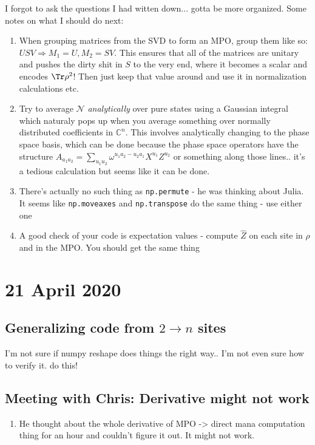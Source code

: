 \documentclass{report}
\begin{document}
I forgot to ask the questions I had witten down... gotta be more organized. Some notes on what I should do next:
\begin{enumerate}
\item When grouping matrices from the SVD to form an MPO, group them like so: $USV\Rightarrow M_1 = U, M_2= SV$. This ensures that all of the matrices are unitary and pushes the dirty shit in $S$ to the very end, where it becomes a scalar and encodes $\Tr \rho^2$! Then just keep that value around and use it in normalization calculations etc.
\item Try to average $\mathcal N$ \textit{analytically} over pure states using a Gaussian integral which naturaly pops up when you average something over normally distributed coefficients in $\mathbb C^n$. This involves analytically changing to the phase space basis, which can be done because the phase space operators have the structure $A_{a_1a_2}=\sum_{u_1u_2}\omega^{u_1a_2-u_2a_1}X^{u_1}Z^{u_2}$ or something along those lines.. it's a tedious calculation but seems like it can be done.
\item There's actually no such thing as \lstinline{np.permute} - he was thinking about Julia. It seems like \lstinline{np.moveaxes} and \lstinline{np.transpose} do the same thing - use either one
\item A good check of your code is expectation values - compute $\hat Z$ on each site in $\rho$ and in the MPO. You should get the same thing
\end{enumerate}

\chapter{21 April 2020}

\section{Generalizing code from $2\to n$ sites}

I'm not sure if numpy reshape does things the right way.. I'm not even sure how to verify it. \todo do this!

\section{Meeting with Chris: Derivative might not work}

\begin{enumerate}
\item He thought about the whole derivative of MPO -> direct mana computation thing for an hour and couldn't figure it out. It might not work.
\end{enumerate}
\end{document}
